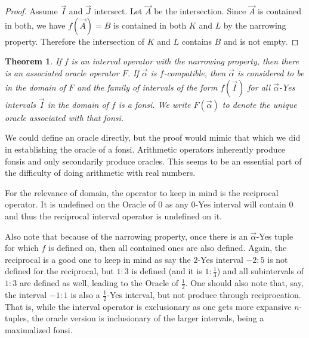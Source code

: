 \documentclass[12pt]{article}
\newtheorem{theorem}{Theorem}[subsection]
\begin{document}
\begin{proof}
Assume $\vec{I}$ and $\vec{J}$ intersect. Let $\vec{A}$ be the intersection. Since $\vec{A}$ is contained in both, we have $f(\vec A)= B$ is contained in both $K$ and $L$ by the narrowing property. Therefore the intersection of $K$ and $L$ contains $B$ and is not empty.  
\end{proof}


\begin{theorem}\label{th:intop}
If $f$ is an interval operator with the narrowing property, then there is an associated oracle operator $F$. If $\vec{\alpha}$ is $f$-compatible, then $\vec{\alpha}$ is considered to be in the domain of $F$ and the family of intervals of the form $f(\vec{I})$ for all $\vec{\alpha}$-Yes intervals $\vec{I}$ in the domain of $f$ is a fonsi. We write $F(\vec{\alpha})$ to denote the unique oracle associated with that fonsi. 
\end{theorem}

We could define an oracle directly, but the proof would mimic that which we did in establishing the oracle of a fonsi. Arithmetic operators inherently produce fonsis and only secondarily produce oracles. This seems to be an essential part of the difficulty of doing arithmetic with real numbers. 

For the relevance of domain, the operator to keep in mind is the reciprocal operator. It is undefined on the Oracle of 0 as any 0-Yes interval will contain 0 and thus the reciprocal interval operator is undefined on it. 

Also note that because of the narrowing property, once there is an $\vec{\alpha}$-Yes tuple for which $f$ is defined on, then all contained ones are also defined. Again, the reciprocal is a good one to keep in mind as say the $2$-Yes interval $-2:5$ is not defined for the reciprocal, but $1:3$ is defined (and it is $1:\frac{1}{3}$) and all subintervals of $1:3$ are defined as well, leading to the Oracle of $\frac{1}{2}$. One should also note that, say, the interval $-1:1$ is also a $\frac{1}{2}$-Yes interval, but not produce through reciprocation. That is, while the interval operator is exclusionary as one gets more expansive $n$-tuples, the oracle version is inclusionary of the larger intervals, being a maximalized fonsi. 
\end{document}
